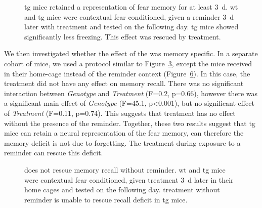 \begin{figure}[h]
    \begin{subfigure}[h]{\textwidth}
        
        \caption{\label{f.ad.reminder1.paradigm}}
    \end{subfigure}
    \begin{subfigure}[h]{\textwidth}
        
        \caption{\label{f.ad.reminder1.res}}
    \end{subfigure}
    \caption[\tglu{} treatment during a brief reminder rescues memory deficit.]{\gls{tg} mice retained a representation of fear memory for at least \SI{3}{\day}. \gls{wt} and \gls{tg} mice were contextual fear conditioned, given a reminder \SI{3}{\day} later with treatment and tested on the following day. \gls{tg} mice showed significantly less freezing. This effect was rescued by \tglu{} treatment. \label{f.ad.reminder1}}
\end{figure}

We then investigated whether the effect of the \tglu{} was memory specific. In a separate cohort of mice, we used a protocol similar to  Figure~\ref{f.ad.reminder1}, except the mice received \tglu{} in their home-cage instead of the reminder context (Figure~\ref{f.ad.reminder2}). In this case, the \tglu{} treatment did not have any effect on memory recall. There was no significant interaction between \textit{Genotype} and \textit{Treatment} (F=0.2, p=0.66), however there was a significant main effect of \textit{Genotype} (F=45.1, p<0.001), but no significant effect of \textit{Treatment} (F=0.11, p=0.74). This suggests that \tglu{} treatment has no effect without the presence of the reminder. Together, these two results suggest that \gls{tg} mice can retain a neural representation of the fear memory, can therefore the memory deficit is not due to forgetting. The \tglu{} treatment during exposure to a reminder can rescue this deficit. 


\begin{figure}[h]
    \begin{subfigure}[h]{\textwidth}
        
        \caption{\label{f.ad.reminder2.paradigm}}
    \end{subfigure}
    \begin{subfigure}[h]{\textwidth}
        
        \caption{\label{f.ad.reminder2.res}}
    \end{subfigure}
    \caption[\tglu{} treatment does not rescue memory recall without reminder.]{\tglu{} does not rescue memory recall without reminder. \gls{wt} and \gls{tg} mice were contextual fear conditioned, given treatment \SI{3}{\day} later in their home cages and tested on the following day. \tglu{} treatment without reminder is unable to rescue recall deficit in \gls{tg} mice. \label{f.ad.reminder2}}
\end{figure}

